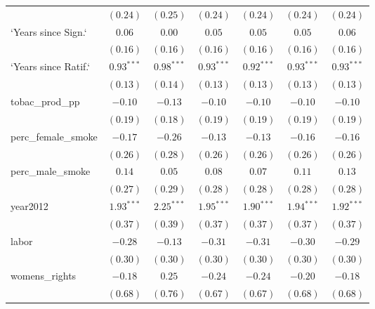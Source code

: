 \begin{table}[!h]
\begin{center}
\begin{tabular}{l c c c c c c }
                        & $(0.24)$     & $(0.25)$     & $(0.24)$     & $(0.24)$     & $(0.24)$     & $(0.24)$     \\
`Years since Sign.`     & $0.06$       & $0.00$       & $0.05$       & $0.05$       & $0.05$       & $0.06$       \\
                        & $(0.16)$     & $(0.16)$     & $(0.16)$     & $(0.16)$     & $(0.16)$     & $(0.16)$     \\
`Years since Ratif.`    & $0.93^{***}$ & $0.98^{***}$ & $0.93^{***}$ & $0.92^{***}$ & $0.93^{***}$ & $0.93^{***}$ \\
                        & $(0.13)$     & $(0.14)$     & $(0.13)$     & $(0.13)$     & $(0.13)$     & $(0.13)$     \\
tobac\_prod\_pp         & $-0.10$      & $-0.13$      & $-0.10$      & $-0.10$      & $-0.10$      & $-0.10$      \\
                        & $(0.19)$     & $(0.18)$     & $(0.19)$     & $(0.19)$     & $(0.19)$     & $(0.19)$     \\
perc\_female\_smoke     & $-0.17$      & $-0.26$      & $-0.13$      & $-0.13$      & $-0.16$      & $-0.16$      \\
                        & $(0.26)$     & $(0.28)$     & $(0.26)$     & $(0.26)$     & $(0.26)$     & $(0.26)$     \\
perc\_male\_smoke       & $0.14$       & $0.05$       & $0.08$       & $0.07$       & $0.11$       & $0.13$       \\
                        & $(0.27)$     & $(0.29)$     & $(0.28)$     & $(0.28)$     & $(0.28)$     & $(0.28)$     \\
year2012                & $1.93^{***}$ & $2.25^{***}$ & $1.95^{***}$ & $1.90^{***}$ & $1.94^{***}$ & $1.92^{***}$ \\
                        & $(0.37)$     & $(0.39)$     & $(0.37)$     & $(0.37)$     & $(0.37)$     & $(0.37)$     \\
labor                   & $-0.28$      & $-0.13$      & $-0.31$      & $-0.31$      & $-0.30$      & $-0.29$      \\
                        & $(0.30)$     & $(0.30)$     & $(0.30)$     & $(0.30)$     & $(0.30)$     & $(0.30)$     \\
womens\_rights          & $-0.18$      & $0.25$       & $-0.24$      & $-0.24$      & $-0.20$      & $-0.18$      \\
                        & $(0.68)$     & $(0.76)$     & $(0.67)$     & $(0.67)$     & $(0.68)$     & $(0.68)$     \\

\end{tabular}
\end{center}
\end{table}
